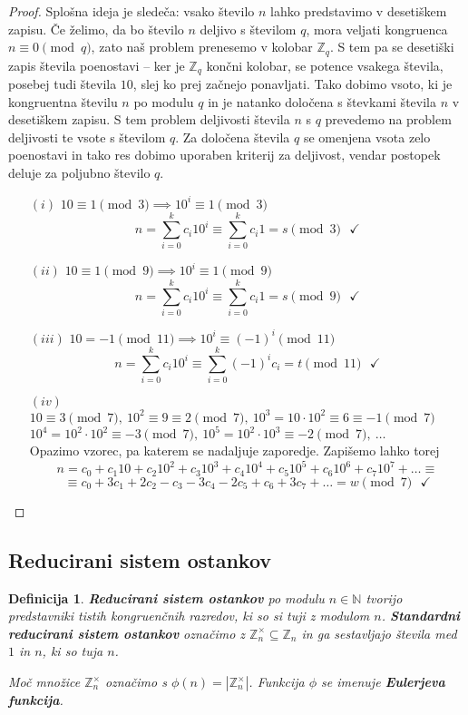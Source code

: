\documentclass[12pt, a4paper]{article}
\newtheorem{defi}{Definicija}
\begin{document}
\begin{proof}
Splošna ideja je sledeča: vsako število $n$ lahko predstavimo v desetiškem zapisu. Če želimo, da bo število $n$ deljivo s številom $q$, mora veljati kongruenca $n\equiv 0 \pmod{q}$, zato naš problem prenesemo v kolobar $\mathbb{Z}_{q}$. S tem pa se desetiški zapis števila poenostavi -- ker je $\mathbb{Z}_{q}$ končni kolobar, se potence vsakega števila, posebej tudi števila $10$, slej ko prej začnejo ponavljati. Tako dobimo vsoto, ki je kongruentna številu $n$ po modulu $q$ in je natanko določena s števkami števila $n$ v desetiškem zapisu. S tem problem deljivosti števila $n$ s $q$ prevedemo na problem deljivosti te vsote s številom $q$. Za določena števila $q$ se omenjena vsota zelo poenostavi in tako res dobimo uporaben kriterij za deljivost, vendar postopek deluje za poljubno število $q$.
\begin{itemize}
\item[$(i)$] $10\equiv 1 \pmod 3\implies 10^{i}\equiv 1 \pmod 3 $
$$ n=\sum_{i=0}^{k}c_{i}10^{i} \equiv \sum_{i=0}^{k}c_{i}1 =s\pmod 3 \ \ \ \checkmark$$
\item[$(ii)$] $10\equiv 1 \pmod 9 \implies 10^{i}\equiv 1\pmod 9$
$$ n=\sum_{i=0}^{k}c_{i}10^{i} \equiv \sum_{i=0}^{k}c_{i}1 =s\pmod 9 \ \ \ \checkmark$$
\item[$(iii)$] $10=-1\pmod{11} \implies 10^{i}\equiv (-1)^{i} \pmod{11}$
$$ n=\sum_{i=0}^{k}c_{i}10^{i} \equiv \sum_{i=0}^{k}(-1)^{i}c_{i} =t\pmod{11} \ \ \ \checkmark$$
\item[$(iv)$] $10\equiv 3 \pmod 7,\ 10^{2}\equiv 9\equiv 2\pmod 7,\ 10^{3}=10\cdot 10^{2}\equiv 6\equiv -1 \pmod7$\\
$10^{4}=10^{2}\cdot10^{2}\equiv -3\pmod7,\ 10^{5}=10^{2}\cdot 10^{3}\equiv -2 \pmod 7,\ \ldots$\\
Opazimo vzorec, pa katerem se nadaljuje zaporedje. Zapišemo lahko torej
$$ n=c_{0}+c_{1}10+c_{2}10^{2}+c_{3}10^{3}+c_{4}10^{4}+c_{5}10^{5}+c_{6}10^{6}+c_{7}10^{7}+\ldots\equiv$$
$$ \equiv c_{0}+3c_{1}+2c_{2}-c_{3}-3c_{4}-2c_{5}+c_{6}+3c_{7}+\ldots = w\pmod 7 \ \ \ \checkmark$$
\end{itemize}
\end{proof}

\subsection{Reducirani sistem ostankov}

\begin{defi}
\textbf{Reducirani sistem ostankov} po modulu $n\in \mathbb{N}$ tvorijo predstavniki tistih kongruenčnih razredov, ki so si tuji z modulom $n$. \textbf{Standardni reducirani sistem ostankov} označimo z $\mathbb{Z}_{n}^{\times}\subseteq \mathbb{Z}_{n}$ in ga sestavljajo števila med $1$ in $n$, ki so tuja $n$.

\noindent
Moč množice $\mathbb{Z}_{n}^{\times}$ označimo s $\phi(n)=|\mathbb{Z}_{n}^{\times}|$. Funkcija $\phi$ se imenuje \textbf{Eulerjeva funkcija}.
\end{defi}
\end{document}

